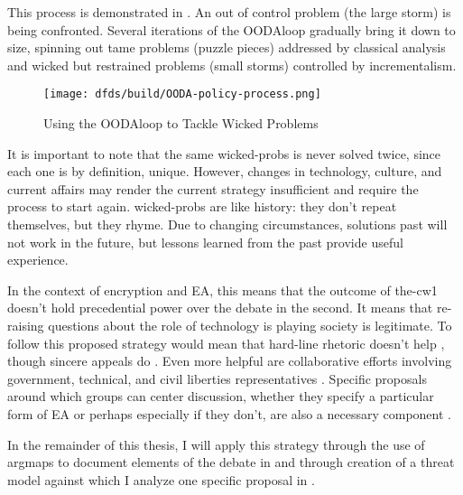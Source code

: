 
This process is demonstrated in . An out of control problem (the large storm) is being
confronted. Several iterations of the \ac{OODAloop} gradually bring it down to size, spinning out tame problems (puzzle
pieces) addressed by classical analysis and wicked but restrained problems (small storms) controlled by
\ac{incrementalism}.

\begin{figure}[h]
  \centering\CaptionFontSize
  \texttt{[image: dfds/build/OODA-policy-process.png]}
  \caption{Using the \ac{OODAloop} to Tackle Wicked Problems}
  \label{fig-policy-ooda-process}
\end{figure}

It is important to note that the same \acp{wicked-prob} is never solved twice, since each one is by definition, unique.
However, changes in technology, culture, and current affairs may render the current strategy insufficient and require
the process to start again. \Acp{wicked-prob} are like history: they don't repeat themselves, but they rhyme. Due to
changing circumstances, solutions past will not work in the future, but lessons learned from the past provide useful
experience.

In the context of \ac{encryption} and \ac{EA}, this means that the outcome of \ac{the-cw1} doesn't hold precedential
power over the debate in the second. It means that re-raising questions about the role of technology is playing society
is legitimate. To follow this proposed strategy would mean that hard-line rhetoric doesn't help \cite{ruiz_there_2018}
\cite{geller_2019}, though sincere appeals do \cite{abelson_2015} \cite{intl_2020} \cite{rozenshtein_2019}. Even more
helpful are collaborative efforts involving government, technical, and civil liberties representatives
\cite{committee_decrypting_2018} \cite{group_2019}. Specific proposals around which groups can center discussion,
whether they specify a particular form of \ac{EA} or perhaps especially if they don't, are also a necessary component
\cite{kerr_encryption_2017} \cite{wright_crypto_2018} \cite{phan_key_2017}.

In the remainder of this thesis, I will apply this strategy through the use of \acp{argmap} to document elements of the
debate in  and through creation of a threat model against which I analyze one specific proposal
in .
